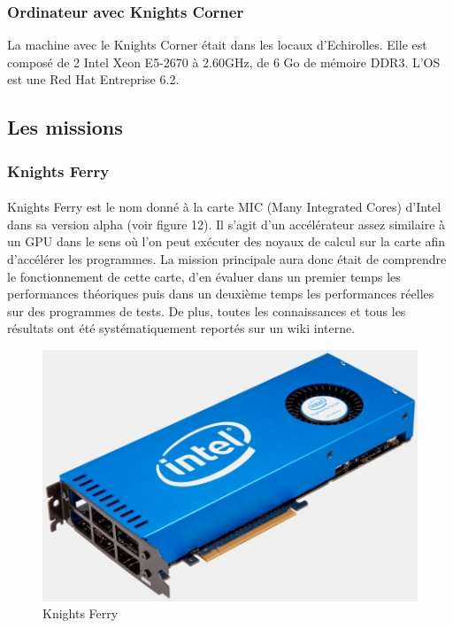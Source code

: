 \documentclass[11pt]{article}
\begin{document}
			\subsubsection{Ordinateur avec Knights Corner}
			La machine avec le Knights Corner était dans les locaux d'Echirolles. Elle est composé de 2 Intel Xeon E5-2670 à 2.60GHz, de 6 Go de mémoire 
			DDR3. L'OS est une Red Hat Entreprise 6.2.
		\subsection{Les missions}
			\subsubsection{Knights Ferry}
				\paragraph{}
				Knights Ferry est le nom donné à la carte MIC (Many Integrated Cores) d'Intel dans sa version alpha (voir figure 12). Il s'agit 
				d'un accélérateur assez similaire à un GPU dans le sens où l'on peut exécuter des noyaux de calcul sur la 
				carte afin d'accélérer les programmes. La mission principale aura donc était de comprendre le fonctionnement de cette
				carte, d'en évaluer dans un premier temps les performances théoriques puis dans un deuxième temps les 
				performances réelles sur des programmes de tests. De plus, toutes les connaissances et tous les résultats ont 
				été systématiquement reportés sur un wiki interne.
				\begin{figure}
				\begin{center}
				\includegraphics[scale=0.75]{IntelMIC.jpg}
				\caption{Knights Ferry}
				\end{center}
				\end{figure}
\end{document}
